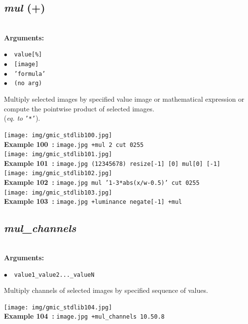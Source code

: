 \documentclass[a4paper,10.5pt,twoside]{book}
\def\comma{\discretionary{,}{}{,}}
\newcommand{\Cb}[1]{\textcolor{cb}{#1}}
\begin{document}
\subsection{\emph{mul} (+)}\vspace*{-0.7em}
~\\\textbf{\Cb{Arguments: }}\begin{flushleft}
{\small \Cb{\hspace*{0.5cm}$\bullet$~~\texttt{value[\%]}}}~~~\\
{\small \Cb{\hspace*{0.5cm}$\bullet$~~\texttt{[image]}}}~~~\\
{\small \Cb{\hspace*{0.5cm}$\bullet$~~\texttt{'formula'}}}~~~\\
{\small \Cb{\hspace*{0.5cm}$\bullet$~~\texttt{(no arg)}}}\end{flushleft}
Multiply selected images by specified value{\comma} image or mathematical expression{\comma}
or compute the pointwise product of selected images.
~\\(\emph{eq. to} {\small \texttt{'*'}}).
\begin{center}\texttt{[image: img/gmic\_stdlib100.jpg]}\\
{\footnotesize \textbf{Example 100~:} \texttt{image.jpg +mul 2 cut 0{\comma}255}}
\\\texttt{[image: img/gmic\_stdlib101.jpg]}\\
{\footnotesize \textbf{Example 101~:} \texttt{image.jpg (1{\comma}2{\comma}3{\comma}4{\comma}5{\comma}6{\comma}7{\comma}8) resize[-1] [0] mul[0] [-1]}}
\\\texttt{[image: img/gmic\_stdlib102.jpg]}\\
{\footnotesize \textbf{Example 102~:} \texttt{image.jpg mul '1-3*abs(x/w-0.5)' cut 0{\comma}255}}
\\\texttt{[image: img/gmic\_stdlib103.jpg]}\\
{\footnotesize \textbf{Example 103~:} \texttt{image.jpg +luminance negate[-1] +mul}}
\end{center}

\subsection{\emph{mul\_channels} }\vspace*{-0.7em}
~\\\textbf{\Cb{Arguments: }}\begin{flushleft}
{\small \Cb{\hspace*{0.5cm}$\bullet$~~\texttt{value1{\comma}\_value2{\comma}...{\comma}\_valueN}}}\end{flushleft}
Multiply channels of selected images by specified sequence of values.
\begin{center}\texttt{[image: img/gmic\_stdlib104.jpg]}\\
{\footnotesize \textbf{Example 104~:} \texttt{image.jpg +mul\_channels 1{\comma}0.5{\comma}0.8}}
\end{center}
\end{document}
